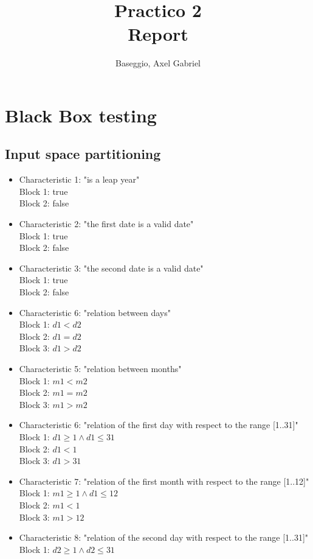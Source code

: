 \documentclass[12pt,a4paper]{article}
\title{Practico 2 \\ \large{Report}}
\author{Baseggio, Axel Gabriel}
\begin{document}
\maketitle

\section{Black Box testing}
\subsection{Input space partitioning}
\begin{itemize}
\item Characteristic 1: "is a leap year"
\\Block 1: true
\\Block 2: false
\item Characteristic 2: "the first date is a valid date"
\\Block 1: true
\\Block 2: false
\item Characteristic 3: "the second date is a valid date"
\\Block 1: true
\\Block 2: false
\item Characteristic 6: "relation between days"
\\Block 1: $d1 < d2$
\\Block 2: $d1 = d2$
\\Block 3: $d1 > d2$
\item Characteristic 5: "relation between months"
\\Block 1: $m1 < m2$
\\Block 2: $m1 = m2$
\\Block 3: $m1 > m2$
\item Characteristic 6: "relation of the first day with respect to the range [1..31]"
\\Block 1: $d1 \geq 1 \land d1 \leq 31$
\\Block 2: $d1 < 1$
\\Block 3: $d1 > 31$
\item Characteristic 7: "relation of the first month with respect to the range [1..12]"
\\Block 1: $m1 \geq 1 \land d1 \leq 12$
\\Block 2: $m1 < 1$
\\Block 3: $m1 > 12$
\item Characteristic 8: "relation of the second day with respect to the range [1..31]"
\\Block 1: $d2 \geq 1 \land d2 \leq 31$

\end{itemize}
\end{document}
